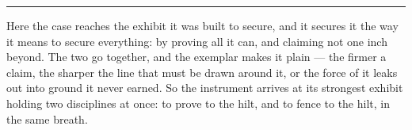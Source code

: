 %
%
%
%

\bigskip
\begin{center}
\rule{0.4\textwidth}{0.4pt}
\end{center}
\bigskip

\noindent Here the case reaches the exhibit it was built to secure, and it secures it the way it means to secure
everything: by proving all it can, and claiming not one inch beyond. The two go together, and the exemplar makes
it plain --- the firmer a claim, the sharper the line that must be drawn around it, or the force of it leaks out
into ground it never earned. So the instrument arrives at its strongest exhibit holding two disciplines at once:
to prove to the hilt, and to fence to the hilt, in the same breath.

